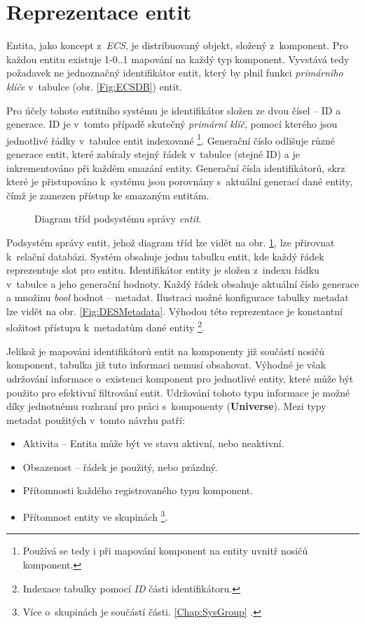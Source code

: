 \section{Reprezentace entit}

Entita, jako koncept z~\emph{ECS}, je distribuovaný objekt, složený z~komponent. Pro každou entitu existuje 1-0..1 mapování na každý typ komponent. Vyvstává tedy požadavek ne jednoznačný identifikátor entit, který by plnil funkci \emph{primárního klíče} v~tabulce (obr. \ref{Fig:ECSDB}) entit.

Pro účely tohoto entitního systému je identifikátor složen ze dvou čísel -- ID a generace. ID je v~tomto případě skutečný \emph{primární klíč}, pomocí kterého jsou jednotlivé řádky v~tabulce entit indexované \footnote{Používá se tedy i při mapování komponent na entity uvnitř nosičů komponent.}. Generační číslo odlišuje různé generace entit, které zabíraly stejný řádek v~tabulce (stejné ID) a je inkrementováno při každém smazání entity. Generační čísla identifikátorů, skrz které je přistupováno k~systému jsou porovnány s~aktuální generací dané entity, čímž je zamezen přístup ke smazaným entitám.

\begin{figure}[H]
	\caption{Diagram tříd podsystému správy \emph{entit}.}
	\label{Fig:DESEntityDiagram}
\end{figure}

Podsystém správy entit, jehož diagram tříd lze vidět na obr. \ref{Fig:DESEntityDiagram}, lze přirovnat k~relační databázi. Systém obsahuje jednu tabulku entit, kde každý řádek reprezentuje slot pro entitu. Identifikátor entity je složen z~indexu řádku v~tabulce a jeho generační hodnoty. Každý řádek obsahuje aktuální číslo generace a množinu \emph{bool} hodnot -- metadat. Ilustraci možné konfigurace tabulky metadat lze vidět na obr. \ref{Fig:DESMetadata}. Výhodou této reprezentace je konstantní složitost přístupu k~metadatům dané entity \footnote{Indexace tabulky pomocí \emph{ID} části identifikátoru.}. 

Jelikož je mapováni identifikátorů entit na komponenty již součástí nosičů komponent, tabulka již tuto informaci nemusí obsahovat. Výhodné je však udržování informace o~existenci komponent pro jednotlivé entity, které může být použito pro efektivní filtrování entit. Udržování tohoto typu informace je možné díky jednotnému rozhraní pro práci s~komponenty (\textbf{Universe}). Mezi typy metadat použitých v~tomto návrhu patří: 
\begin{itemize}
	\item Aktivita -- Entita může být ve stavu aktivní, nebo neaktivní.
	\item Obsazenost -- řádek je použitý, nebo prázdný. 
	\item Přítomnosti každého registrovaného typu komponent.
	\item Přítomnost entity ve skupinách \footnote{Více o~skupinách je součástí části. \ref{Chap:SysGroup} .}.
\end{itemize}

